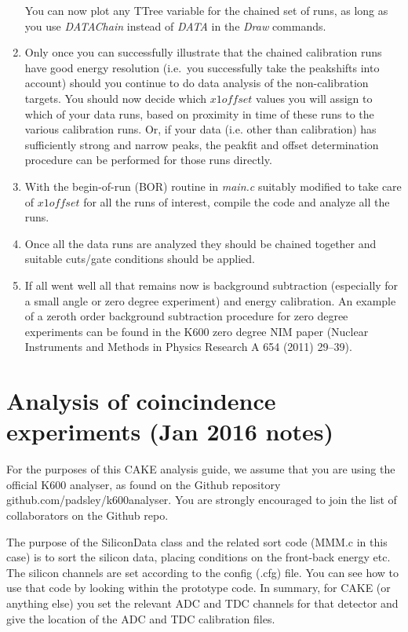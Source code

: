 \documentclass[11pt]{report}
\begin{document}
\begin{enumerate}
You can now plot any TTree variable for the chained set of runs, as long as you use
{\it DATAChain} instead of {\it DATA} in the {\it Draw} commands.

\item Only once you can successfully illustrate that the chained calibration runs
have good energy resolution (i.e.~you successfully take the peakshifts into account)
should you continue to do data analysis of the non-calibration targets.
You should now decide which $x1offset$ values you will assign to which
of your data runs, based on proximity in time of these runs to the various
calibration runs.
Or, if your data (i.e. other than calibration) has sufficiently strong and narrow peaks, the
peakfit and offset determination procedure can be performed for those runs directly.


\item With the begin-of-run (BOR) routine in {\it main.c} suitably modified to take care 
of $x1offset$ for all the runs of interest, compile the code and analyze all the runs.

\item Once all the data runs are analyzed they should be chained together and suitable
cuts/gate conditions should be applied.


\item If all went well all that remains now is background subtraction (especially for a small angle or
zero degree experiment) and energy calibration.
An example of a zeroth order background subtraction procedure for zero degree experiments can be found in the
K600 zero degree NIM paper (Nuclear Instruments and Methods in Physics Research A 654 (2011) 29–39).



\end{enumerate}


\section{Analysis of coincindence experiments (Jan 2016 notes)}\label{sec:analysiscoincidence}


For the purposes of this CAKE analysis guide, we assume that you are using the official K600 analyser, as found on the Github repository github.com/padsley/k600analyser. You are strongly encouraged to join the list of collaborators on the Github repo.

The purpose of the SiliconData class and the related sort code (MMM.c in this case) is to sort the silicon data, placing conditions on the front-back energy etc. The silicon channels are set according to the config (.cfg) file. You can see how to use that code by looking within the prototype code. In summary, for CAKE (or anything else) you set the relevant ADC and TDC channels for that detector and give the location of the ADC and TDC calibration files.
\end{document}
